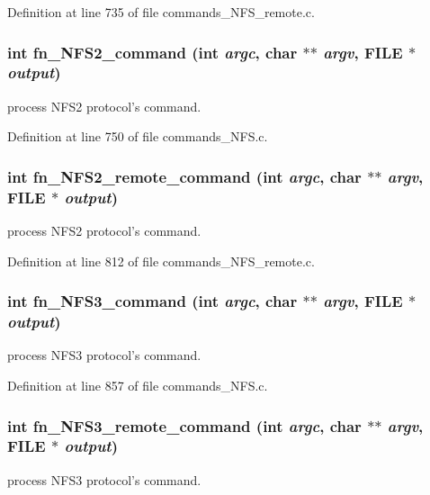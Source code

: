 Definition at line 735 of file commands\_\-NFS\_\-remote.c.
\subsubsection[{fn\_\-NFS2\_\-command}]{\setlength{\rightskip}{0pt plus 5cm}int fn\_\-NFS2\_\-command (int {\em argc}, \/  char $\ast$$\ast$ {\em argv}, \/  FILE $\ast$ {\em output})}\label{commands_8h_a684fcaaca8949d8362e3b4d23fa1821c}
process NFS2 protocol's command. 

Definition at line 750 of file commands\_\-NFS.c.
\subsubsection[{fn\_\-NFS2\_\-remote\_\-command}]{\setlength{\rightskip}{0pt plus 5cm}int fn\_\-NFS2\_\-remote\_\-command (int {\em argc}, \/  char $\ast$$\ast$ {\em argv}, \/  FILE $\ast$ {\em output})}\label{commands_8h_a53ac76af43fede3f2e559a1b4fbb136f}
process NFS2 protocol's command. 

Definition at line 812 of file commands\_\-NFS\_\-remote.c.
\subsubsection[{fn\_\-NFS3\_\-command}]{\setlength{\rightskip}{0pt plus 5cm}int fn\_\-NFS3\_\-command (int {\em argc}, \/  char $\ast$$\ast$ {\em argv}, \/  FILE $\ast$ {\em output})}\label{commands_8h_a07e03c4595dc082f2a667e25574e2d90}
process NFS3 protocol's command. 

Definition at line 857 of file commands\_\-NFS.c.
\subsubsection[{fn\_\-NFS3\_\-remote\_\-command}]{\setlength{\rightskip}{0pt plus 5cm}int fn\_\-NFS3\_\-remote\_\-command (int {\em argc}, \/  char $\ast$$\ast$ {\em argv}, \/  FILE $\ast$ {\em output})}\label{commands_8h_accf667520f77b36c51d5d17bf8938c28}
process NFS3 protocol's command. 

